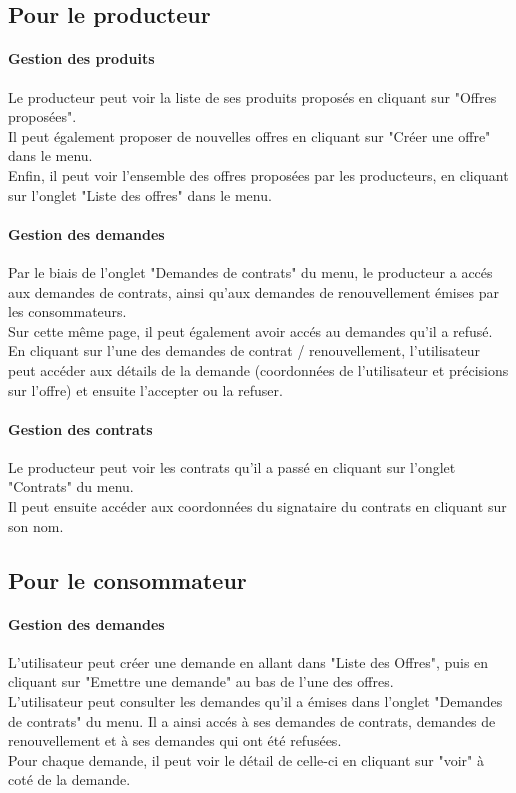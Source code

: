 \documentclass[12pt]{report}
\begin{document}
\subsection{Pour le producteur}
\paragraph{Gestion des produits}
Le producteur peut voir la liste de ses produits proposés en cliquant sur "Offres proposées".\\
Il peut également proposer de nouvelles offres en cliquant sur "Créer une offre" dans le menu.\\
Enfin, il peut voir l'ensemble des offres proposées par les producteurs, en cliquant sur l'onglet "Liste des offres" dans le menu.

\paragraph{Gestion des demandes}
Par le biais de l'onglet "Demandes de contrats" du menu, le producteur a accés aux demandes de contrats, ainsi qu'aux demandes de renouvellement émises par les consommateurs.\\
Sur cette même page, il peut également avoir accés au demandes qu'il a refusé.\\
En cliquant sur l'une des demandes de contrat / renouvellement, l'utilisateur peut accéder aux détails de la demande (coordonnées de l'utilisateur et précisions sur l'offre) et ensuite l'accepter ou la refuser.

\paragraph{Gestion des contrats}
Le producteur peut voir les contrats qu'il a passé en cliquant sur l'onglet "Contrats" du menu.\\
Il peut ensuite accéder aux coordonnées du signataire du contrats en cliquant sur son nom.

\subsection{Pour le consommateur}
\paragraph{Gestion des demandes}
L'utilisateur peut créer une demande en allant dans "Liste des Offres", puis en cliquant sur "Emettre une demande" au bas de l'une des offres.\\
L'utilisateur peut consulter les demandes qu'il a émises dans l'onglet "Demandes de contrats" du menu. Il a ainsi accés à ses demandes de contrats, demandes de renouvellement et à ses demandes qui ont été refusées.\\
Pour chaque demande, il peut voir le détail de celle-ci en cliquant sur "voir" à coté de la demande.
\end{document}
